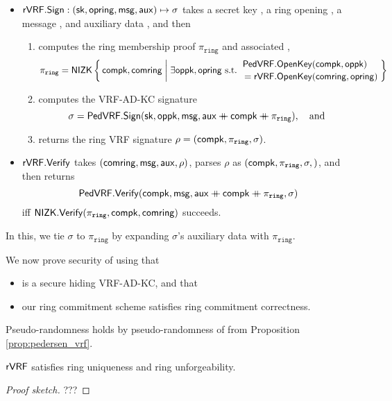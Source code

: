 \newcommand\piring{\ensuremath{\pi_{\mathtt{ring}}}\xspace}

\begin{itemize}
\item ${\mathsf{rVRF}}.{\mathsf{Sign}} : (\mathsf{sk},\mathsf{opring},\mathsf{msg},\mathsf{aux}) \mapsto \sigma$ takes
 a secret key \sk, a ring opening \openring, a message \msg, and auxiliary data \aux, and then \\
 \begin{enumerate}
 \item computes the ring membership proof $\piring$ and associated \openpk,
  $$ \piring = \NIZK \Setst{ \compk, \comring }{
  \exists \openpk,\openring \textrm{\ s.t.\ } 
  \genfrac{}{}{0pt}{}{\PedVRF.\OpenKey(\compk,\openpk) \quad}{\,\, = \rVRF.\OpenKey(\comring,\openring)}
  } $$
 \item computes the VRF-AD-KC signature
  $$ \sigma = \PedVRF.\Sign(\sk,\openpk,\msg,\aux \doubleplus \compk \doubleplus \piring), \quad\textrm{and} $$ %
 \item returns the ring VRF signature $\rho = (\compk,\piring,\sigma)$.
 \end{enumerate}
\item ${\mathsf{rVRF}}.{\mathsf{Verify}}$ takes $(\mathsf{comring},\mathsf{msg},\mathsf{aux},\rho)$,
 parses $\rho$ as $(\compk,\piring,\sigma,)$,  and then returns
 $$ \PedVRF.\Verify(\compk,\msg,\aux \doubleplus \compk \doubleplus \piring,\sigma) $$
 iff $\NIZK.\Verify(\piring,\compk,\comring)$ succeeds. 
\end{itemize}

In this, we tie $\sigma$ to $\piring$ by expanding $\sigma$'s auxiliary data with $\piring$.

\smallskip

We now prove security of \rVRF using that
\begin{itemize}
\item \PedVRF is a secure hiding VRF-AD-KC, and that
\item our ring commitment scheme satisfies ring commitment correctness.
\end{itemize}

Pseudo-randomness holds by pseudo-randomness of \PedVRF from
 Proposition \ref{prop:pedersen_vrf}.

\begin{proposition}\label{prop:pedersen_rvrf}
${\mathsf{rVRF}}$ satisfies ring uniqueness and ring unforgeability.
\end{proposition}

\begin{proof}[Proof sketch]
???
\end{proof}


